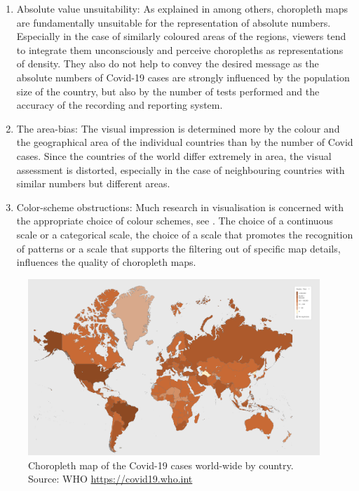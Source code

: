 \documentclass[article]{jdssv}\usepackage[]{graphicx}\usepackage[]{color}
\begin{document}
\begin{enumerate}
\item Absolute value unsuitability: As explained in \citep{monmonier2005, slocum2008, speckmann2010} among others, choropleth maps are fundamentally unsuitable for the representation of absolute numbers. Especially in the case of similarly coloured areas of the regions, viewers tend to integrate them unconsciously and perceive choropleths as representations of density. They also do not help to convey the desired message as the absolute numbers of Covid-19 cases are strongly influenced by the population size of the country, but also by the number of tests performed and the accuracy of the recording and reporting system.
\item The area-bias: The visual impression is determined more by the colour and the geographical area of the individual countries than by the number of Covid cases. Since the countries of the world differ extremely in area, the visual assessment is distorted, especially in the case of neighbouring countries with similar numbers but different areas.
\item Color-scheme obstructions: Much research in visualisation is concerned with the appropriate choice of colour schemes, see \citep{brewer1997}. The choice of a continuous scale or a categorical scale, the choice of a scale that promotes the recognition of patterns or a scale that supports the filtering out of specific map details, influences the quality of choropleth maps.  
\end{enumerate}

\begin{figure}
	\includegraphics[width = 0.98\textwidth]{Figures_Web/who_totalcases_choro.png}
	\caption{Choropleth map of the Covid-19 cases world-wide by country. Source: WHO \url{https://covid19.who.int}}
	\label{fig:choro1}
\end{figure}
\end{document}
